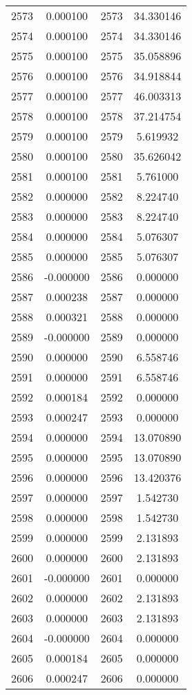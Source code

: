 \documentclass[12pt]{article}
\begin{document}
\begin{longtable}{@{}cccc@{}}
2573 & 0.000100 & 2573 & 34.330146 \\
2574 & 0.000100 & 2574 & 34.330146 \\
2575 & 0.000100 & 2575 & 35.058896 \\
2576 & 0.000100 & 2576 & 34.918844 \\
2577 & 0.000100 & 2577 & 46.003313 \\
2578 & 0.000100 & 2578 & 37.214754 \\
2579 & 0.000100 & 2579 & 5.619932 \\
2580 & 0.000100 & 2580 & 35.626042 \\
2581 & 0.000100 & 2581 & 5.761000 \\
2582 & 0.000000 & 2582 & 8.224740 \\
2583 & 0.000000 & 2583 & 8.224740 \\
2584 & 0.000000 & 2584 & 5.076307 \\
2585 & 0.000000 & 2585 & 5.076307 \\
2586 & -0.000000 & 2586 & 0.000000 \\
2587 & 0.000238 & 2587 & 0.000000 \\
2588 & 0.000321 & 2588 & 0.000000 \\
2589 & -0.000000 & 2589 & 0.000000 \\
2590 & 0.000000 & 2590 & 6.558746 \\
2591 & 0.000000 & 2591 & 6.558746 \\
2592 & 0.000184 & 2592 & 0.000000 \\
2593 & 0.000247 & 2593 & 0.000000 \\
2594 & 0.000000 & 2594 & 13.070890 \\
2595 & 0.000000 & 2595 & 13.070890 \\
2596 & 0.000000 & 2596 & 13.420376 \\
2597 & 0.000000 & 2597 & 1.542730 \\
2598 & 0.000000 & 2598 & 1.542730 \\
2599 & 0.000000 & 2599 & 2.131893 \\
2600 & 0.000000 & 2600 & 2.131893 \\
2601 & -0.000000 & 2601 & 0.000000 \\
2602 & 0.000000 & 2602 & 2.131893 \\
2603 & 0.000000 & 2603 & 2.131893 \\
2604 & -0.000000 & 2604 & 0.000000 \\
2605 & 0.000184 & 2605 & 0.000000 \\
2606 & 0.000247 & 2606 & 0.000000 \\

\end{longtable}
\end{document}
